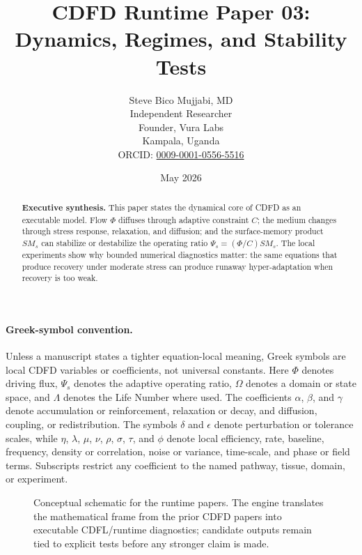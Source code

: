 \documentclass[12pt,a4paper]{article}
\title{\textbf{CDFD Runtime Paper 03: Dynamics, Regimes, and Stability Tests}}
\author{Steve Bico Mujjabi, MD\\
\small Independent Researcher\\
\small Founder, Vura Labs\\
\small Kampala, Uganda\\
\small ORCID: \href{https://orcid.org/0009-0001-0556-5516}{0009-0001-0556-5516}}
\date{May 2026}
\begin{document}
\maketitle

\begin{abstract}
\noindent \textbf{Executive synthesis.} This paper states the dynamical core of
CDFD as an executable model. Flow $\Phi$ diffuses through adaptive constraint
$C$; the medium changes through stress response, relaxation, and diffusion; and
the surface-memory product $S M_s$ can stabilize or destabilize the operating
ratio $\Psi_s=(\Phi/C)S M_s$. The local experiments show why bounded numerical
diagnostics matter: the same equations that produce recovery under moderate
stress can produce runaway hyper-adaptation when recovery is too weak.
\end{abstract}


\paragraph{Greek-symbol convention.}
Unless a manuscript states a tighter equation-local meaning, Greek symbols are local CDFD variables or coefficients, not universal constants. Here $\Phi$ denotes driving flux, $\Psi_s$ denotes the adaptive operating ratio, $\Omega$ denotes a domain or state space, and $\Lambda$ denotes the Life Number where used. The coefficients $\alpha$, $\beta$, and $\gamma$ denote accumulation or reinforcement, relaxation or decay, and diffusion, coupling, or redistribution. The symbols $\delta$ and $\epsilon$ denote perturbation or tolerance scales, while $\eta$, $\lambda$, $\mu$, $\nu$, $\rho$, $\sigma$, $\tau$, and $\phi$ denote local efficiency, rate, baseline, frequency, density or correlation, noise or variance, time-scale, and phase or field terms. Subscripts restrict any coefficient to the named pathway, tissue, domain, or experiment.

\begin{figure}[ht]
\centering
{}
\caption{Conceptual schematic for the runtime papers. The engine translates the mathematical frame from the prior CDFD papers into executable CDFL/runtime diagnostics; candidate outputs remain tied to explicit tests before any stronger claim is made.}
\end{figure}
\end{document}

